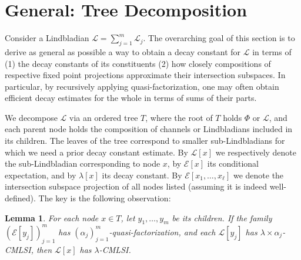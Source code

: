 \documentclass[11pt,reqno]{amsart}
\newtheorem{lemma}{Lemma}[section]
\newcommand{\E}{\mathcal{E}}
\newcommand{\pl}{\hspace{.1cm}}
\renewcommand{\L}{\mathcal{L}}
\begin{document}
\section{General: Tree Decomposition}
Consider a Lindbladian $\L = \sum_{j=1}^m \L_j$. The overarching goal of this section is to derive as general as possible a way to obtain a decay constant for $\L$ in terms of (1) the decay constants of its constituents (2) how closely compositions of respective fixed point projections approximate their intersection subspaces. In particular, by recursively applying quasi-factorization, one may often obtain efficient decay estimates for the whole in terms of sums of their parts.

We decompose $\L$ via an ordered tree $T$, where the root of $T$ holds $\Phi$ or $\L$, and each parent node holds the composition of channels or Lindbladians included in its children. The leaves of the tree correspond to smaller sub-Lindbladians for which we need a prior decay constant estimate. %
By $\L[x]$ we respectively denote the sub-Lindbladian corresponding to node $x$, by $\E[x]$ its conditional expectation, and by $\lambda[x]$ its decay constant. By $\E[x_1, \dots, x_\ell]$ we denote the intersection subspace projection of all nodes listed (assuming it is indeed well-defined). The key is the following observation:
\begin{lemma} \normalfont \label{lem:lindblad-tree}
    For each node $x \in T$, let $y_1, \dots, y_m$ be its children.
    If the family$(\E[y_j])_{j=1}^m$ has $(\alpha_j)_{j=1}^{m}$-quasi-factorization, and each $\L[y_j]$ has $\lambda \times \alpha_j$-CMLSI, then $\L[x]$ has $\lambda$-CMLSI.
\end{lemma}
\end{document}
